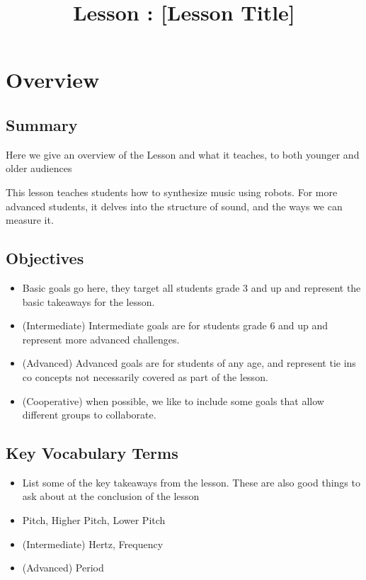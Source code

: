 \documentclass{lessonplan}
\title{Lesson \lessonNumber: [Lesson Title]}
\author{\linkHome}
\date{}
\begin{document}
  \maketitle

  \section{Overview}
    \subsection{Summary}
      Here we give an overview of the Lesson and what it teaches, to
      both younger and older audiences

      This lesson teaches students how to synthesize music using
      robots.  For more advanced students, it delves into the
      structure of sound, and the ways we can measure it.
    \subsection{Objectives}
    \begin{itemize}
      \item Basic goals go here, they target all students grade 3 and
        up and represent the basic takeaways for the lesson.
      \item (Intermediate) Intermediate goals are for students grade 6
        and up and represent more advanced challenges.
      \item (Advanced) Advanced goals are for students of any age, and
       represent tie ins co concepts not necessarily covered as part
        of the lesson.
      \item (Cooperative) when possible, we like to include some goals
        that allow different groups to collaborate.
    \end{itemize}
    \subsection{Key Vocabulary Terms}
    \begin{itemize}
      \item List some of the key takeaways from the lesson.  These are
        also good things to ask about at the conclusion of the lesson
      \item Pitch, Higher Pitch, Lower Pitch
      \item (Intermediate) Hertz, Frequency
      \item (Advanced) Period
    \end{itemize}
\end{document}
